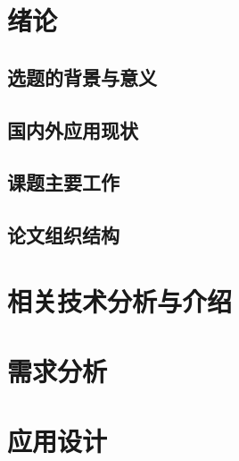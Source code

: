 \documentclass{ecnuthesis}
\begin{document}
    \frontmatter

    \begin{abstract}
    \end{abstract}

    \begin{abstractEN}
    \end{abstractEN}

    \mainmatter


    \chapter{绪论}\label{ch:intro}


    \section{选题的背景与意义}\label{sec:background}


    \section{国内外应用现状}\label{sec:status}


    \section{课题主要工作}\label{sec:work}


    \section{论文组织结构}\label{sec:structure}


    \chapter{相关技术分析与介绍}\label{ch:tech}


    \chapter{需求分析}\label{ch:requirement}


    \chapter{应用设计}\label{ch:design}
\end{document}
